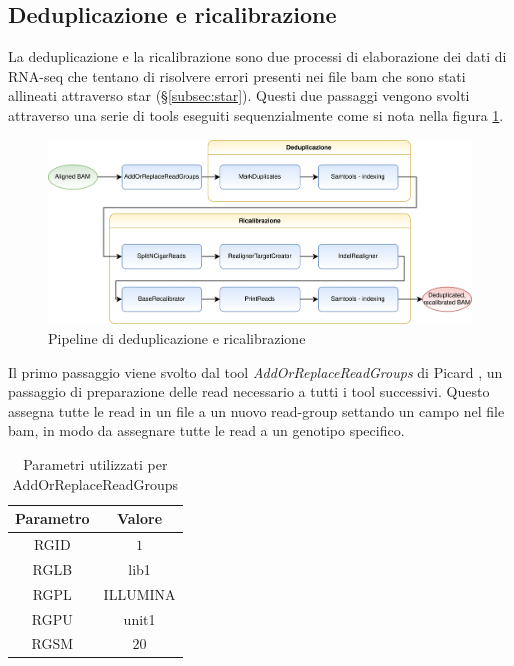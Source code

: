 	\subsection{Deduplicazione e ricalibrazione}
        \label{subsec:deduprecab}
	La deduplicazione e la ricalibrazione sono due processi di elaborazione dei dati di RNA-seq che tentano di risolvere errori presenti nei file bam che sono stati allineati attraverso star (\S\ref{subsec:star}).
  Questi due passaggi vengono svolti attraverso una serie di tools eseguiti sequenzialmente come si nota nella figura \ref{fig:pipeline_deduprecal}.
  \begin{figure}[H]
    \centering
    \includegraphics[scale=0.17]{deduprecal.png}
    \caption{Pipeline di deduplicazione e ricalibrazione}
    \label{fig:pipeline_deduprecal}
  \end{figure}
  Il primo passaggio viene svolto dal tool \emph{AddOrReplaceReadGroups} \cite{addorreplacegroup} di Picard \cite{picard}, un passaggio di preparazione delle read necessario a tutti i tool successivi.
  Questo assegna tutte le read in un file a un nuovo read-group settando un campo nel file bam, in modo da assegnare tutte le read a un genotipo specifico.
  \begin{table}[H]
        \centering
        \begin{tabular}{|c|c|}
                \hline
                Parametro & Valore\\
                \hline
                RGID & $1$\\
                \hline
                RGLB & lib1\\
                \hline
                RGPL & ILLUMINA\\
                \hline
                RGPU & unit1\\
                \hline
                RGSM & $20$\\
                \hline
         \end{tabular}
         \caption{Parametri utilizzati per AddOrReplaceReadGroups}
    \end{table}

